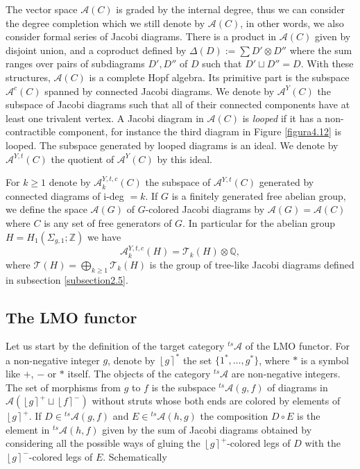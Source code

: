 \documentclass[10pt]{amsart}
\numberwithin{equation}{section}
\numberwithin{equation}{section}
\theoremstyle{definition}
\begin{document}
The vector space $\mathcal{A}(C)$ is graded by the internal degree, thus we can consider the degree completion which we still denote by $\mathcal{A}(C)$, in other words, we also consider formal series of Jacobi diagrams. There is a product in $\mathcal{A}(C)$ given by disjoint union, and a coproduct defined by $\Delta(D):=\sum D'\otimes D''$ where the sum ranges over pairs of  subdiagrams $D',D''$ of $D$ such that $D'\sqcup D''=D$. With these structures, $\mathcal{A}(C)$ is a complete Hopf algebra. Its primitive part is the subspace $\mathcal{A}^c(C)$ spanned by connected Jacobi diagrams. We denote by $\mathcal{A}^Y(C)$ the subspace of Jacobi diagrams  such that all of their  connected components  have at least one trivalent vertex.  A Jacobi diagram in $\mathcal{A}(C)$ is \emph{looped} if it has a non-contractible component, for instance the third diagram in Figure \ref{figura4.12} is looped. The subspace generated by looped diagrams is an ideal. We denote by $\mathcal{A}^{Y,t}(C)$ the quotient of $\mathcal{A}^Y(C)$ by this ideal.

For $k\geq 1$ denote by $\mathcal{A}_k^{Y,t,c}(C)$ the subspace of $\mathcal{A}^{Y,t}(C)$ generated by connected  diagrams of i-deg $=k$. If $G$ is a finitely generated free abelian group, we define the space $\mathcal{A}(G)$  of $G$-colored Jacobi diagrams by $\mathcal{A}(G)=\mathcal{A}(C)$ where $C$ is any set of free generators of $G$.  In particular for the abelian group $H=H_1(\Sigma_{g,1};\mathbb{Z})$   we have 
$$\mathcal{A}_k^{Y,t,c}(H)=\mathcal{T}_k(H)\otimes \mathbb{Q},$$
where $\mathcal{T}(H)=\bigoplus _{k\geq 1} \mathcal{T}_k(H)$ is the group of tree-like Jacobi diagrams defined in subsection \ref{subsection2.5}.






\subsection{The LMO functor}\label{section5.3} Let us start by the definition of the target category ${}^{ts}\!\!\mathcal{A}$ of the LMO functor. For a non-negative integer $g$,  denote by $\left\lfloor g \right\rceil^*$ the set $\{1^*,\ldots, g^* \}$, where $*$ is a symbol like $+$, $-$ or $*$ itself.   The objects of the category ${}^{ts}\!\!\mathcal{A}$ are non-negative integers. The set of morphisms from $g$ to $f$ is the subspace ${}^{ts}\!\!\mathcal{A}(g,f)$ of diagrams in $\mathcal{A}(\left\lfloor g\right\rceil^+\sqcup \left\lfloor f\right\rceil^-)$ without struts whose both ends are colored by elements of $\left\lfloor g\right\rceil^+$. If $D\in {}^{ts}\!\!\mathcal{A}(g,f)$ and $E\in {}^{ts}\!\!\mathcal{A}(h,g)$ the composition $D\circ E$ is the element in ${}^{ts}\!\!\mathcal{A}(h,f)$ given by the sum  of Jacobi diagrams obtained by considering all the possible ways of gluing the $\left\lfloor g\right\rceil^+$-colored legs of $D$ with the $\left\lfloor g\right\rceil^-$-colored legs of $E$. Schematically
\end{document}
